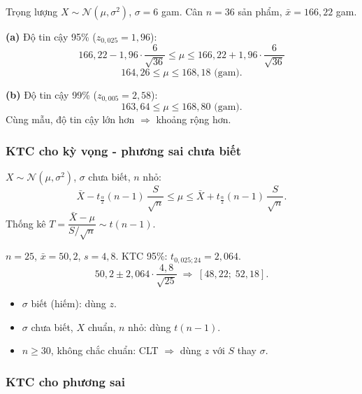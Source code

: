 \documentclass[12pt,a4paper]{article}
\begin{document}
\begin{vidu}[title={Trọng lượng sản phẩm - KTC cho $\mu$}]
Trọng lượng $X \sim \mathcal{N}(\mu, \sigma^2)$, $\sigma = 6$ gam. Cân $n=36$ sản phẩm, $\bar{x} = 166{,}22$ gam.

\medskip
\textbf{(a)} Độ tin cậy 95\% ($z_{0{,}025} = 1{,}96$):
\[
  166{,}22 - 1{,}96 \cdot \dfrac{6}{\sqrt{36}} \le \mu \le 166{,}22 + 1{,}96 \cdot \dfrac{6}{\sqrt{36}}
\]
\[
  \boxed{164{,}26 \le \mu \le 168{,}18 \text{ (gam)}}.
\]

\medskip
\textbf{(b)} Độ tin cậy 99\% ($z_{0{,}005} = 2{,}58$):
\[
  \boxed{163{,}64 \le \mu \le 168{,}80 \text{ (gam)}}.
\]
Cùng mẫu, độ tin cậy lớn hơn $\Rightarrow$ khoảng rộng hơn.
\end{vidu}

\subsubsection{KTC cho kỳ vọng - phương sai chưa biết}

\begin{congthuc}[title={KTC cho $\mu$ khi $\sigma$ chưa biết}]
  $X \sim \mathcal{N}(\mu,\sigma^2)$, $\sigma$ chưa biết, $n$ nhỏ:
  \[
    \bar{X} - t_{\frac{\alpha}{2}}(n-1)\,\dfrac{S}{\sqrt{n}} \le \mu \le \bar{X} + t_{\frac{\alpha}{2}}(n-1)\,\dfrac{S}{\sqrt{n}}.
  \]
  Thống kê $T = \dfrac{\bar{X}-\mu}{S/\sqrt{n}} \sim t(n-1)$.
\end{congthuc}

\begin{vidu}[title={KTC cho trọng lượng - $\sigma$ chưa biết}]
$n=25$, $\bar{x}=50{,}2$, $s=4{,}8$. KTC 95\%: $t_{0{,}025;24} = 2{,}064$.
\[
  50{,}2 \pm 2{,}064 \cdot \dfrac{4{,}8}{\sqrt{25}} \;\Rightarrow\; [48{,}22;\; 52{,}18].
\]
\end{vidu}

\begin{luuy}[title={Khi nào dùng $z$ và $t$?}]
\begin{itemize}
  \item $\sigma$ biết (hiếm): dùng $z$.
  \item $\sigma$ chưa biết, $X$ chuẩn, $n$ nhỏ: dùng $t(n-1)$.
  \item $n \ge 30$, không chắc chuẩn: CLT $\Rightarrow$ dùng $z$ với $S$ thay $\sigma$.
\end{itemize}
\end{luuy}

\subsubsection{KTC cho phương sai}
\end{document}
